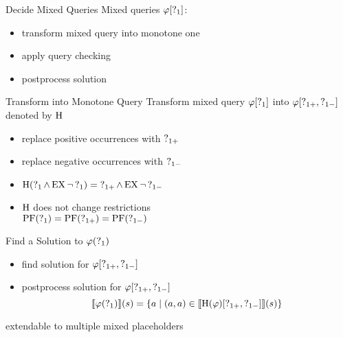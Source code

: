 \begin{frame}{Decide Mixed Queries}
  Mixed queries $\varphi[\operatorname{?}_1]$:
  \begin{itemize}
    \item transform mixed query into monotone one
    \item apply query checking
    \item postprocess solution
  \end{itemize}
\end{frame}

\begin{frame}{Transform into Monotone Query}
  Transform mixed query $\varphi[\operatorname{?}_1]$ into $\varphi[\operatorname{?}_{1+},\operatorname{?}_{1-}]$ 
  denoted by $\operatorname{H}$
  \begin{itemize}
    \item replace positive occurrences with $\operatorname{?}_{1+}$
    \item replace negative occurrences with $\operatorname{?}_{1-}$
    \item $\operatorname{H}(\operatorname{?}_1 \land \operatorname{EX} \lnot \operatorname{?}_1) = \operatorname{?}_{1+} \land \operatorname{EX} \lnot \operatorname{?}_{1-}$
    \item $\operatorname{H}$ does not change restrictions \\ 
          $\operatorname{PF}(\operatorname{?}_{1}) = \operatorname{PF}(\operatorname{?}_{1+}) = \operatorname{PF}(\operatorname{?}_{1-})$
  \end{itemize}
\end{frame}

\begin{frame}{Find a Solution to $\varphi(\operatorname{?}_1)$}
  \begin{itemize}
    \item find solution for $\varphi[\operatorname{?}_{1+},\operatorname{?}_{1-}]$
    \item postprocess solution for $\varphi[\operatorname{?}_{1+},\operatorname{?}_{1-}]$
      \[
        \llbracket \varphi(\operatorname{?}_1) \rrbracket (s) = \{ a \mid (a,a) \in 
          \llbracket \operatorname{H} (\varphi)[\operatorname{?}_{1+},\operatorname{?}_{1-}] \rrbracket (s) \}
      \]
  \end{itemize}
  
  extendable to multiple mixed placeholders
\end{frame}
